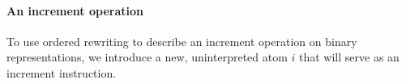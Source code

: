 







\paragraph{An increment operation}
To use ordered rewriting to describe an increment operation on binary representations, we introduce a new, uninterpreted atom $i$ that will serve as an increment instruction.

